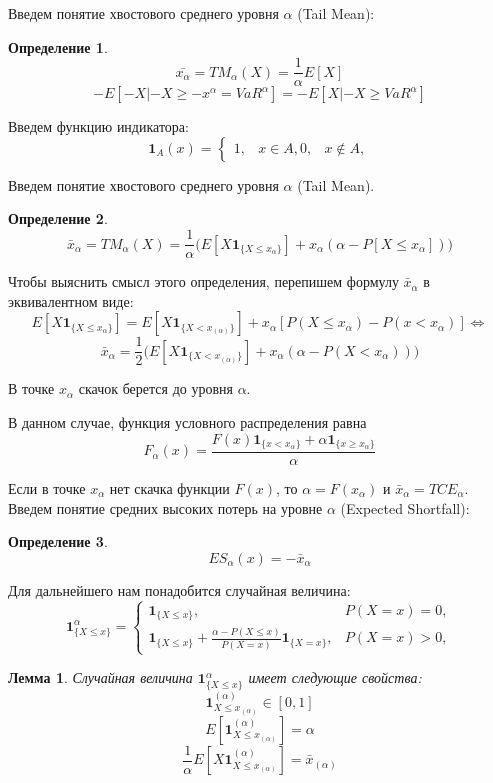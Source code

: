 \documentclass[14pt,a4paper]{article}
\theoremstyle{plain}
\newtheorem{Lemma}{Лемма}[section]
\theoremstyle{definition}
\newtheorem{Def}{Определение}[section]
\begin{document}
Введем понятие хвостового среднего уровня $\alpha$ (Tail Mean):

\begin{Def} \label{main}
$$
\bar{x_{\alpha}} = TM_{\alpha}(X) = \frac{1}{\alpha}E[X]
$$
$$
-E[-X| -X \ge -x^{\alpha}=VaR^{\alpha}] = -E[X| -X \ge VaR^{\alpha}]
$$
\end{Def}


Введем функцию индикатора:
$$
\mathbf{1}_A(x) =
\left\{\begin{matrix}
1, &x \in A,
0, &x \notin A,
\end{matrix}\right.
$$


Введем понятие хвостового среднего уровня $\alpha$ (Tail Mean).

\begin{Def} \label{main}
$$
\bar{x}_{\alpha} = TM_{\alpha}(X) = \frac{1}{\alpha}\Big(E[X\mathbf{1}_{\{X\le x_\alpha\}}] +x_\alpha(\alpha-P[X\le x_\alpha])\Big)
$$
\end{Def}
Чтобы выяснить смысл этого определения, перепишем формулу $\bar{x}_{\alpha}$ в эквивалентном виде:
$$
E[X\mathbf{1}_{\{X\le x_\alpha\}}] = E[X\mathbf{1}_{\{X < x_{(\alpha)}\}}] + x_\alpha[P(X \le x_\alpha) - P(x <x_\alpha)] \Leftrightarrow
$$
$$
\bar{x}_{\alpha}  = \frac{1}{2} \Bigg( E[X\mathbf{1}_{\{X < x_{(\alpha)}\} }] + x_\alpha (\alpha - P(X<x_\alpha)) \Bigg)
$$


В точке $x_{\alpha}$ скачок берется до уровня $\alpha$.


В данном случае, функция условного распределения равна
$$
F_\alpha(x) = \frac{F(x)\mathbf{1}_{\{x<x_\alpha\}} + \alpha\mathbf{1}_{\{x\ge x_\alpha\}}   }{\alpha}
$$


Если в точке $x_{\alpha}$ нет скачка функции $F(x)$, то $\alpha = F(x_{\alpha})$ и $\bar{x}_{\alpha} = TCE_\alpha$.
Введем понятие средних высоких потерь на уровне $\alpha$ (Expected Shortfall):
\begin{Def} \label{main}
$$
ES_\alpha(x) = - \bar{x}_{\alpha}
$$
\end{Def}

Для дальнейшего нам понадобится случайная величина:
$$
\mathbf{1}^\alpha_{\{X \le x\}} =\begin{cases}
\mathbf{1}_{\{X \le x\}}, &P(X=x)=0,\\
\mathbf{1}_{\{X \le x\}} + \frac{\alpha-P(X \le x)}{P(X=x)}\mathbf{1}_{\{X = x\}}, &P(X=x)>0,
\end{cases}
$$

\begin{Lemma}
Случайная величина $\mathbf{1}^\alpha_{\{X \le x\}}$ имеет следующие свойства:
\begin{equation}
\mathbf{1}^{(\alpha)}_{X\le x_{(\alpha)}} \in [0,1]
\end{equation}
\begin{equation}
E[\mathbf{1}^{(\alpha)}_{X\le x_{(\alpha)}} ] = \alpha
\end{equation}
\begin{equation}
\frac{1}{\alpha}E[X\mathbf{1}^{(\alpha)}_{X\le x_{(\alpha)}} ] = \bar{x}_{(\alpha)}
\end{equation}
\end{Lemma}
\end{document}
